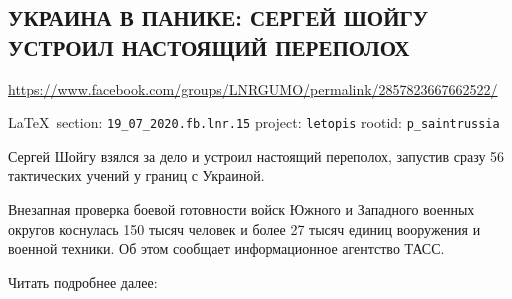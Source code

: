  
 
\subsection{УКРАИНА В ПАНИКЕ: СЕРГЕЙ ШОЙГУ УСТРОИЛ НАСТОЯЩИЙ ПЕРЕПОЛОХ}
\label{sec:19_07_2020.fb.lnr.15}
\url{https://www.facebook.com/groups/LNRGUMO/permalink/2857823667662522/}
  
\vspace{0.5cm}
{\small\LaTeX~section: \verb|19_07_2020.fb.lnr.15| project: \verb|letopis| rootid: \verb|p_saintrussia|}
\vspace{0.5cm}
 
Сергей Шойгу взялся за дело и устроил настоящий переполох, запустив сразу 56 тактических учений у границ с Украиной.

Внезапная проверка боевой готовности войск Южного и Западного военных округов коснулась 150 тысяч человек и более 27 тысяч единиц вооружения и военной техники. Об этом сообщает информационное агентство ТАСС.

Читать подробнее далее: 
